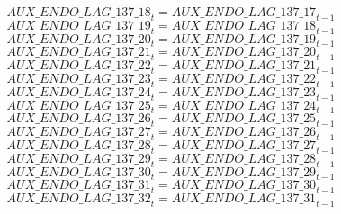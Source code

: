 \begin{dmath}
{AUX\_ENDO\_LAG\_137\_18}_{t}={AUX\_ENDO\_LAG\_137\_17}_{t-1}
\end{dmath}
\begin{dmath}
{AUX\_ENDO\_LAG\_137\_19}_{t}={AUX\_ENDO\_LAG\_137\_18}_{t-1}
\end{dmath}
\begin{dmath}
{AUX\_ENDO\_LAG\_137\_20}_{t}={AUX\_ENDO\_LAG\_137\_19}_{t-1}
\end{dmath}
\begin{dmath}
{AUX\_ENDO\_LAG\_137\_21}_{t}={AUX\_ENDO\_LAG\_137\_20}_{t-1}
\end{dmath}
\begin{dmath}
{AUX\_ENDO\_LAG\_137\_22}_{t}={AUX\_ENDO\_LAG\_137\_21}_{t-1}
\end{dmath}
\begin{dmath}
{AUX\_ENDO\_LAG\_137\_23}_{t}={AUX\_ENDO\_LAG\_137\_22}_{t-1}
\end{dmath}
\begin{dmath}
{AUX\_ENDO\_LAG\_137\_24}_{t}={AUX\_ENDO\_LAG\_137\_23}_{t-1}
\end{dmath}
\begin{dmath}
{AUX\_ENDO\_LAG\_137\_25}_{t}={AUX\_ENDO\_LAG\_137\_24}_{t-1}
\end{dmath}
\begin{dmath}
{AUX\_ENDO\_LAG\_137\_26}_{t}={AUX\_ENDO\_LAG\_137\_25}_{t-1}
\end{dmath}
\begin{dmath}
{AUX\_ENDO\_LAG\_137\_27}_{t}={AUX\_ENDO\_LAG\_137\_26}_{t-1}
\end{dmath}
\begin{dmath}
{AUX\_ENDO\_LAG\_137\_28}_{t}={AUX\_ENDO\_LAG\_137\_27}_{t-1}
\end{dmath}
\begin{dmath}
{AUX\_ENDO\_LAG\_137\_29}_{t}={AUX\_ENDO\_LAG\_137\_28}_{t-1}
\end{dmath}
\begin{dmath}
{AUX\_ENDO\_LAG\_137\_30}_{t}={AUX\_ENDO\_LAG\_137\_29}_{t-1}
\end{dmath}
\begin{dmath}
{AUX\_ENDO\_LAG\_137\_31}_{t}={AUX\_ENDO\_LAG\_137\_30}_{t-1}
\end{dmath}
\begin{dmath}
{AUX\_ENDO\_LAG\_137\_32}_{t}={AUX\_ENDO\_LAG\_137\_31}_{t-1}
\end{dmath}
